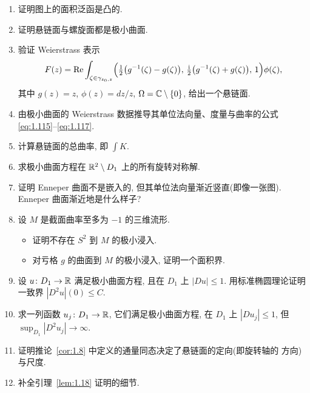 \begin{enumerate}[label=\textbf{Ex \arabic*.},leftmargin=3.7em,
  labelsep=0.5em,itemsep=0.85em,topsep=0.5em,parsep=0.35em]

\item 证明图上的面积泛函是凸的.

\item 证明悬链面与螺旋面都是极小曲面.

\item 验证 Weierstrass 表示
\[
F(z)=\operatorname{Re}\int_{\zeta\in\gamma_{z_0,z}}
\Bigl(\tfrac12\bigl(g^{-1}(\zeta)-g(\zeta)\bigr),\,
\tfrac{\mathrm{i}}{2}\bigl(g^{-1}(\zeta)+g(\zeta)\bigr),\,1\Bigr)\phi(\zeta),
\]
其中 $g(z)=z$, $\phi(z)=dz/z$, $\Omega=\mathbb{C}\setminus\{0\}$, 给出一个悬链面.

\item 由极小曲面的 Weierstrass 数据推导其单位法向量、度量与曲率的公式
\eqref{eq:1.115}--\eqref{eq:1.117}.

\item 计算悬链面的总曲率, 即 $\int K$.

\item 求极小曲面方程在 $\mathbb{R}^2\setminus D_1$ 上的所有旋转对称解.

\item 证明 Enneper 曲面不是嵌入的, 但其单位法向量渐近竖直(即像一张图).
Enneper 曲面渐近地是什么样子?

\item 设 $M$ 是截面曲率至多为 $-1$ 的三维流形.
  \begin{itemize}[label=\textbullet,leftmargin=1.6em,itemsep=0.2em,topsep=0.3em]
  \item 证明不存在 $S^2$ 到 $M$ 的极小浸入.
  \item 对亏格 $g$ 的曲面到 $M$ 的极小浸入, 证明一个面积界.
  \end{itemize}

\item 设 $u\colon D_1\to\mathbb{R}$ 满足极小曲面方程, 且在 $D_1$ 上 $|Du|\leq1$.
用标准椭圆理论证明一致界 $|D^2u|(0)\leq C$.

\item {\setlength{\emergencystretch}{2em}%
求一列函数 $u_j\colon D_1\to\mathbb{R}$, 它们满足极小曲面方程, 在 $D_1$ 上
$|Du_j|\leq1$, 但 $\sup_{D_1}|D^2u_j|\to\infty$.\par}

\item 证明推论~\ref{cor:1.8} 中定义的通量同态决定了悬链面的定向(即旋转轴的
方向)与尺度.

\item 补全引理~\ref{lem:1.18} 证明的细节.


\end{enumerate}
